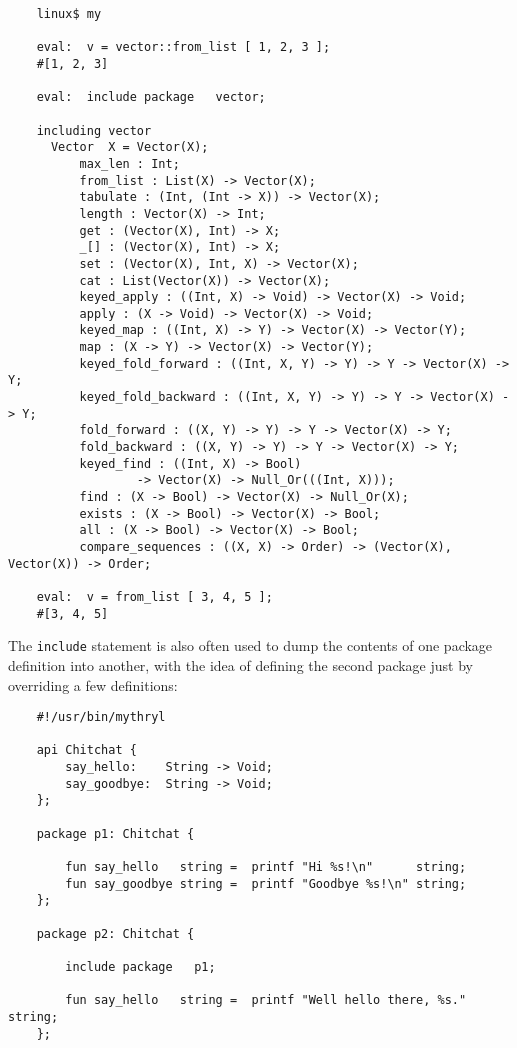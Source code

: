 \begin{verbatim}
    linux$ my

    eval:  v = vector::from_list [ 1, 2, 3 ];
    #[1, 2, 3]

    eval:  include package   vector;

    including vector
      Vector  X = Vector(X);
          max_len : Int;
          from_list : List(X) -> Vector(X);
          tabulate : (Int, (Int -> X)) -> Vector(X);
          length : Vector(X) -> Int;
          get : (Vector(X), Int) -> X;
          _[] : (Vector(X), Int) -> X;
          set : (Vector(X), Int, X) -> Vector(X);
          cat : List(Vector(X)) -> Vector(X);
          keyed_apply : ((Int, X) -> Void) -> Vector(X) -> Void;
          apply : (X -> Void) -> Vector(X) -> Void;
          keyed_map : ((Int, X) -> Y) -> Vector(X) -> Vector(Y);
          map : (X -> Y) -> Vector(X) -> Vector(Y);
          keyed_fold_forward : ((Int, X, Y) -> Y) -> Y -> Vector(X) -> Y;
          keyed_fold_backward : ((Int, X, Y) -> Y) -> Y -> Vector(X) -> Y;
          fold_forward : ((X, Y) -> Y) -> Y -> Vector(X) -> Y;
          fold_backward : ((X, Y) -> Y) -> Y -> Vector(X) -> Y;
          keyed_find : ((Int, X) -> Bool)
                  -> Vector(X) -> Null_Or(((Int, X)));
          find : (X -> Bool) -> Vector(X) -> Null_Or(X);
          exists : (X -> Bool) -> Vector(X) -> Bool;
          all : (X -> Bool) -> Vector(X) -> Bool;
          compare_sequences : ((X, X) -> Order) -> (Vector(X), Vector(X)) -> Order;

    eval:  v = from_list [ 3, 4, 5 ];
    #[3, 4, 5]
\end{verbatim}

The {\tt include} statement is also often used to dump the contents of 
one package definition into another, with the idea of defining the second 
package just by overriding a few definitions:

\begin{verbatim}
    #!/usr/bin/mythryl

    api Chitchat {
        say_hello:    String -> Void;
        say_goodbye:  String -> Void;
    };

    package p1: Chitchat {

        fun say_hello   string =  printf "Hi %s!\n"      string;
        fun say_goodbye string =  printf "Goodbye %s!\n" string;
    };

    package p2: Chitchat {

        include package   p1;

        fun say_hello   string =  printf "Well hello there, %s."  string;
    };
\end{verbatim}

